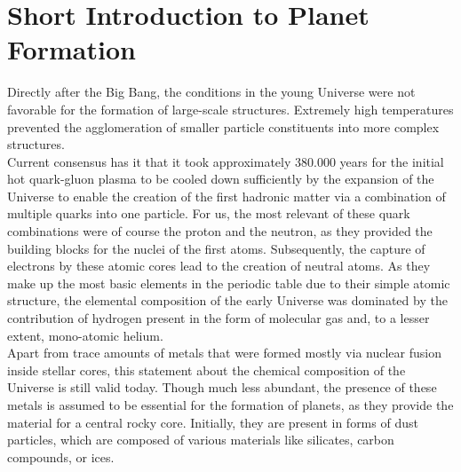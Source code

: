 \section{Short Introduction to Planet Formation}
\label{sec:prerequisites}


    Directly after the Big Bang, the conditions in the young Universe were not favorable for the
    formation of large-scale structures. Extremely high temperatures prevented the agglomeration 
    of smaller particle constituents into more complex structures. \\

    Current consensus has it that it took approximately 380.000 years for
    the initial hot quark-gluon plasma to be cooled down sufficiently by 
    the expansion of the Universe to enable 
    the creation of the first hadronic matter via 
    a combination of multiple quarks into one particle. 
    For us, the most relevant of these quark combinations were of course the proton and the neutron,
    as they provided the building blocks for the nuclei of the first atoms. 
    Subsequently, the capture of electrons by these atomic cores lead to the creation of neutral 
    atoms. As they make up the most basic elements in the periodic table due to their simple 
    atomic structure, 
    the elemental composition of the early Universe was dominated by the contribution 
    of hydrogen present in the form of molecular gas and, to a lesser extent, 
    mono-atomic helium. \\

    Apart from trace amounts of metals that were formed mostly via nuclear fusion inside stellar 
    cores, this statement about the chemical composition of the Universe is still valid today. 
    Though much less abundant, the presence of these metals is assumed to be essential for the 
    formation of planets, as they provide the material for a central rocky core. Initially,
    they are present in forms of dust particles, which are 
    composed of various materials like silicates, carbon compounds, or ices.

